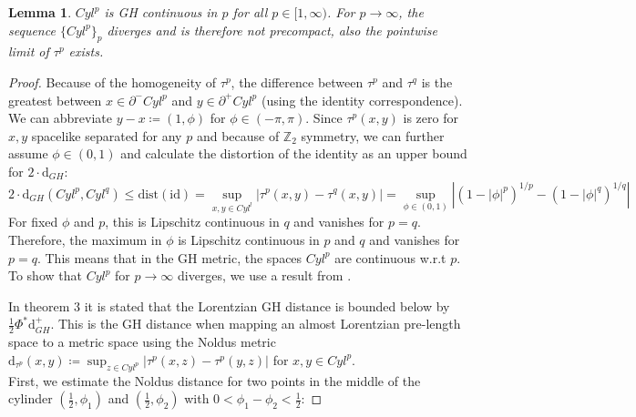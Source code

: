 \documentclass[11pt, a4paper]{article} %
\newcommand{\Z}{\mathbb{Z}} %
\newcommand{\dd}{\text{d}} %
\newtheorem{lemma}[definition]{Lemma}
\theoremstyle{plain} %
\newcommand{\mDef}{\coloneqq }
\begin{document}
\begin{lemma}
    \label{lem_GHPropOfCyl}
    $Cyl^p$ is GH continuous in $p$ for all $p\in[1,\infty)$.
    For $p\to\infty$, the sequence $\{Cyl^p\}_p$ diverges and is therefore not precompact, also the pointwise limit of $\tau^p$ exists. 
\end{lemma}
\vspace{0 cm}
\begin{proof}
Because of the homogeneity of $\tau^p$, the difference between $\tau^p$ and $\tau^q$ is the greatest between $x\in \partial^- Cyl^p$ and $y\in \partial^+ Cyl^p$ (using the identity correspondence). We can abbreviate $y-x \mDef (1,\phi)$ for $\phi \in (-\pi,\pi)$. Since $\tau^p(x,y)$ is zero for $x,y$ spacelike separated for any $p$ and because of $\Z_2$ symmetry, we can further assume $\phi\in (0,1)$ and calculate the distortion of the identity as an upper bound for $2\cdot \dd_{GH}$:
\begin{equation*}
2 \cdot \dd_{GH}(Cyl^p,Cyl^q) \leq \text{dist}(\text{id}) = \sup_{x,y\in Cyl^l}\left|\tau^p(x,y) - \tau^q(x,y)\right| = \sup_{\phi\in (0,1)}\left| \left( 1 -|\phi|^p \right)^{1/p} - \left( 1 -|\phi|^q \right)^{1/q}  \right|
\end{equation*}
For fixed $\phi$ and $p$, this is Lipschitz continuous in $q$ and vanishes for $p=q$. Therefore, the maximum in $\phi$ is Lipschitz continuous in $p$ and $q$ and vanishes for $p=q$.
This means that in the GH metric, the spaces $Cyl^p$ are continuous w.r.t $p$.\\
To show that $Cyl^p$ for $p \to \infty$ diverges, we use a result from \cite{muller2022gromovMetricAndDimension}.\\
\begin{minipage}[t]{0.68\textwidth}
 In theorem 3 it is stated that the Lorentzian GH distance is bounded below by $\frac{1}{2}\Phi^*\dd_{GH}^+$. This is the GH distance when mapping an almost Lorentzian pre-length space to a metric space using the Noldus metric \\
 $\dd_{\tau^p}(x,y) \mDef \sup_{z\in Cyl^p} \left| \tau^p(x,z) - \tau^p(y,z) \right|$ for $x,y\in Cyl^p$.\\
First, we estimate the Noldus distance for two points in the middle of the cylinder $(\frac{1}{2},\phi_1)$ and $(\frac{1}{2},\phi_2)$ with $0< \phi_1 - \phi_2 < \frac{1}{2}$:
\end{minipage}
\begin{minipage}[t]{0.32\textwidth}
\vspace{0cm}
\hspace{0.5 cm}

\end{minipage}
\end{proof}
\end{document}
